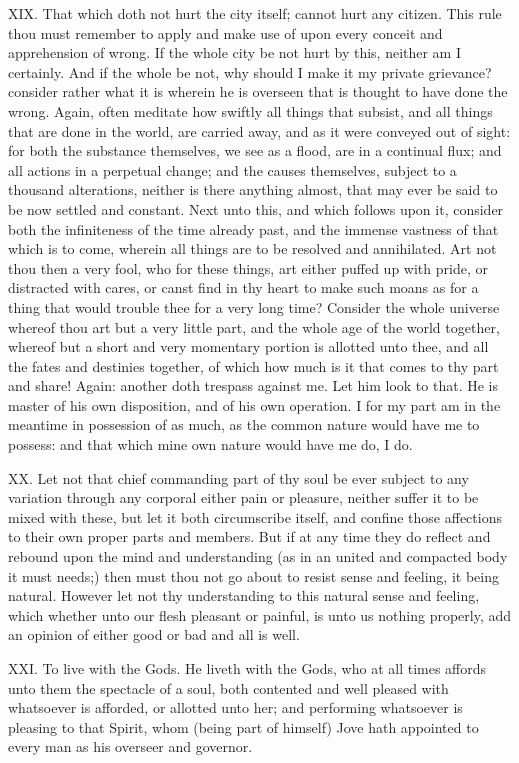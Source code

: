 XIX. That which doth not hurt the city itself; cannot hurt any citizen.
This rule thou must remember to apply and make use of upon every conceit
and apprehension of wrong. If the whole city be not hurt by this, neither
am I certainly. And if the whole be not, why should I make it my private
grievance? consider rather what it is wherein he is overseen that is
thought to have done the wrong. Again, often meditate how swiftly all
things that subsist, and all things that are done in the world, are
carried away, and as it were conveyed out of sight: for both the substance
themselves, we see as a flood, are in a continual flux; and all actions in
a perpetual change; and the causes themselves, subject to a thousand
alterations, neither is there anything almost, that may ever be said to be
now settled and constant. Next unto this, and which follows upon it,
consider both the infiniteness of the time already past, and the immense
vastness of that which is to come, wherein all things are to be resolved
and annihilated. Art not thou then a very fool, who for these things, art
either puffed up with pride, or distracted with cares, or canst find in
thy heart to make such moans as for a thing that would trouble thee for a
very long time? Consider the whole universe whereof thou art but a very
little part, and the whole age of the world together, whereof but a short
and very momentary portion is allotted unto thee, and all the fates and
destinies together, of which how much is it that comes to thy part and
share! Again: another doth trespass against me. Let him look to that. He
is master of his own disposition, and of his own operation. I for my part
am in the meantime in possession of as much, as the common nature would
have me to possess: and that which mine own nature would have me do, I do.

XX. Let not that chief commanding part of thy soul be ever subject to
any variation through any corporal either pain or pleasure, neither suffer
it to be mixed with these, but let it both circumscribe itself, and
confine those affections to their own proper parts and members. But if at
any time they do reflect and rebound upon the mind and understanding (as
in an united and compacted body it must needs;) then must thou not go
about to resist sense and feeling, it being natural. However let not thy
understanding to this natural sense and feeling, which whether unto our
flesh pleasant or painful, is unto us nothing properly, add an opinion of
either good or bad and all is well.

XXI. To live with the Gods. He liveth with the Gods, who at all times
affords unto them the spectacle of a soul, both contented and well pleased
with whatsoever is afforded, or allotted unto her; and performing
whatsoever is pleasing to that Spirit, whom (being part of himself) Jove
hath appointed to every man as his overseer and governor.

